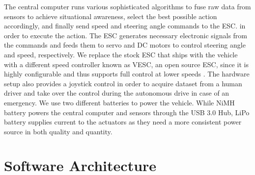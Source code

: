 \begin{table}[h]
\caption{Mini driverless car hardware configuration details.}
\label{table:hardware-configuration}
\end{table}

The central computer runs various sophisticated algorithms to fuse raw data
from sensors to achieve situational awareness, select the best possible action
accordingly, and finally send speed and steering angle commands to the ESC.  in
order to execute the action. The ESC generates necessary electronic signals
from the commands and feeds them to servo and DC motors to control steering
angle and speed, respectively. We replace the stock ESC that ships with the
vehicle with a different speed controller known as VESC, an open source ESC,
since it is highly configurable and thus supports full control at lower speeds
\cite{cite2}. The hardware setup also provides a joystick control in order to
acquire dataset from a human driver and take over the control during the
autonomous drive in case of an emergency. We use two different batteries to
power the vehicle.  While NiMH battery powers the central computer and sensors
through the USB 3.0 Hub, LiPo battery supplies current to the actuators as they
need a more consistent power source in both quality and quantity.

\section{Software Architecture}

